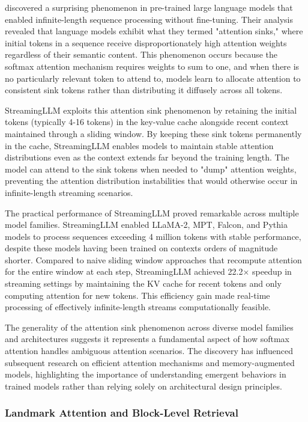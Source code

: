 \documentclass[11pt,letterpaper]{article}
\begin{document}
\cite{xiao2024efficient} discovered a surprising phenomenon in pre-trained large language models that enabled infinite-length sequence processing without fine-tuning. Their analysis revealed that language models exhibit what they termed "attention sinks," where initial tokens in a sequence receive disproportionately high attention weights regardless of their semantic content. This phenomenon occurs because the softmax attention mechanism requires weights to sum to one, and when there is no particularly relevant token to attend to, models learn to allocate attention to consistent sink tokens rather than distributing it diffusely across all tokens.

StreamingLLM exploits this attention sink phenomenon by retaining the initial tokens (typically 4-16 tokens) in the key-value cache alongside recent context maintained through a sliding window. By keeping these sink tokens permanently in the cache, StreamingLLM enables models to maintain stable attention distributions even as the context extends far beyond the training length. The model can attend to the sink tokens when needed to "dump" attention weights, preventing the attention distribution instabilities that would otherwise occur in infinite-length streaming scenarios.

The practical performance of StreamingLLM proved remarkable across multiple model families. StreamingLLM enabled LLaMA-2, MPT, Falcon, and Pythia models to process sequences exceeding 4 million tokens with stable performance, despite these models having been trained on contexts orders of magnitude shorter. Compared to naive sliding window approaches that recompute attention for the entire window at each step, StreamingLLM achieved 22.2$\times$ speedup in streaming settings by maintaining the KV cache for recent tokens and only computing attention for new tokens. This efficiency gain made real-time processing of effectively infinite-length streams computationally feasible.

The generality of the attention sink phenomenon across diverse model families and architectures suggests it represents a fundamental aspect of how softmax attention handles ambiguous attention scenarios. The discovery has influenced subsequent research on efficient attention mechanisms and memory-augmented models, highlighting the importance of understanding emergent behaviors in trained models rather than relying solely on architectural design principles.

\subsubsection{Landmark Attention and Block-Level Retrieval}
\end{document}
